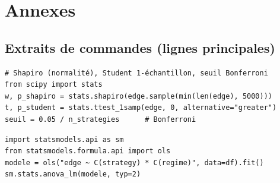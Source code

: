 \chapter{Annexes}
\label{chap:annexes}

\section{Extraits de commandes (lignes principales)}
\label{ann:code}

\begin{lstlisting}[caption={Test de l'avantage moyen (extrait).}]
# Shapiro (normalité), Student 1-échantillon, seuil Bonferroni
from scipy import stats
w, p_shapiro = stats.shapiro(edge.sample(min(len(edge), 5000)))
t, p_student = stats.ttest_1samp(edge, 0, alternative="greater")
seuil = 0.05 / n_strategies      # Bonferroni
\end{lstlisting}

\begin{lstlisting}[caption={ANOVA à deux facteurs avec interaction (extrait).}]
import statsmodels.api as sm
from statsmodels.formula.api import ols
modele = ols("edge ~ C(strategy) * C(regime)", data=df).fit()
sm.stats.anova_lm(modele, typ=2)
\end{lstlisting}

